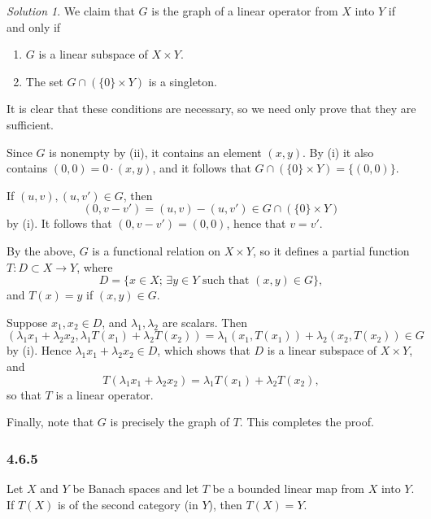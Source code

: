 \documentclass{report}
\theoremstyle{remark}
\newtheorem*{solution}{Solution}
\begin{document}
\begin{solution}
  We claim that $G$ is the graph of a linear operator from $X$ into $Y$ if and only if
  \begin{enumerate}[label=(\roman*)]
    \item $G$ is a linear subspace of $X \times Y$.
    \item The set $G \cap (\{0\} \times Y)$ is a singleton.
  \end{enumerate}
  It is clear that these conditions are necessary, so we need only prove that they are sufficient.

  Since $G$ is nonempty by (ii), it contains an element $(x,y)$. By (i) it also contains $(0,0) = 0 \cdot (x,y)$, and it follows that $G \cap (\{0\} \times Y) = \{(0,0)\}$.

  If $(u,v), (u,v') \in G$, then
  \begin{equation*}
    (0, v - v') = (u,v) - (u,v') \in G \cap (\{0\} \times Y)
  \end{equation*}
  by (i). It follows that $(0, v - v') = (0,0)$, hence that $v = v'$.

  By the above, $G$ is a functional relation on $X \times Y$, so it defines a partial function $T: D \subset X \to Y$, where
  \begin{equation*}
    D = \{x \in X; \, \text{$\exists y \in Y$ such that $(x,y) \in G$}\},
  \end{equation*}
  and $T(x) = y$ if $(x,y) \in G$.

  Suppose $x_1, x_2 \in D$, and $\lambda_1, \lambda_2$ are scalars. Then
  \begin{equation*}
    (\lambda_1 x_1 + \lambda_2 x_2, \lambda_1 T(x_1) + \lambda_2 T(x_2)) = \lambda_1 (x_1, T(x_1)) + \lambda_2 (x_2, T(x_2)) \in G
  \end{equation*}
  by (i). Hence $\lambda_1 x_1 + \lambda_2 x_2 \in D$, which shows that $D$ is a linear subspace of $X \times Y$, and
  \begin{equation*}
    T(\lambda_1 x_1 + \lambda_2 x_2) = \lambda_1 T(x_1) + \lambda_2 T(x_2),
  \end{equation*}
  so that $T$ is a linear operator.

  Finally, note that $G$ is precisely the graph of $T$. This completes the proof.
\end{solution}

\subsubsection*{4.6.5}
Let $X$ and $Y$ be Banach spaces and let $T$ be a bounded linear map from $X$ into $Y$. If $T(X)$ is of the second category (in $Y$), then $T(X) = Y$.
\end{document}
